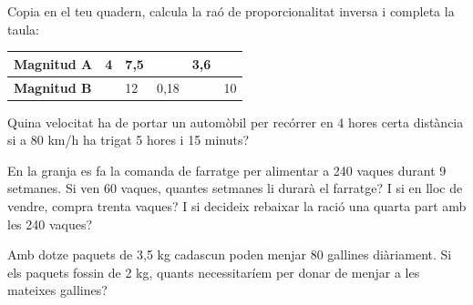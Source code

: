 \begin{activitats}
\begin{mylist}
\exer
  Copia en el teu quadern, calcula la raó de proporcionalitat inversa i
  completa la taula:

\begin{tabular}[]{@{}l|l|l|l|l|l@{}}
\toprule
\textbf{Magnitud A} & 4 & 7,5 & & 3,6 &\tabularnewline
\midrule
\textbf{Magnitud B} & & 12 & 0,18 & & 10\tabularnewline
\bottomrule
\end{tabular}





\exer
  Quina velocitat ha de portar un automòbil per recórrer en 4 hores
  certa distància si a 80 km/h ha trigat 5 hores i 15 minuts?
  
  
  
  

\exer
  En la granja es fa la comanda de farratge per alimentar a 240 vaques
  durant 9 setmanes. Si ven 60 vaques, quantes setmanes li durarà el
  farratge? I si en lloc de vendre, compra trenta vaques? I si decideix
  rebaixar la ració una quarta part amb les 240 vaques?
  
  
  
\exer
  Amb dotze paquets de 3,5 kg cadascun poden menjar 80 gallines
  diàriament. Si els paquets fossin de 2 kg, quants necessitaríem per
  donar de menjar a les mateixes gallines?
  
  
  

\end{mylist}
\end{activitats}
